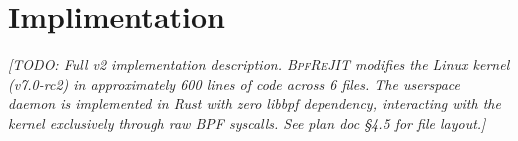 


\section{Implimentation}
\label{sec:implementation}


\textit{[TODO: Full v2 implementation description. \textsc{BpfReJIT}
modifies the Linux kernel (v7.0-rc2) in approximately 600 lines of
code across 6 files. The userspace daemon is implemented in Rust with
zero libbpf dependency, interacting with the kernel exclusively through
raw BPF syscalls. See plan doc \S4.5 for file layout.]}